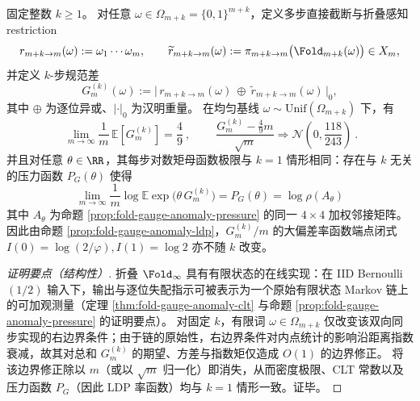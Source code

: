 










\begin{theorem}[多步降阶的规范差密度不变性]\label{thm:fold-gauge-anomaly-kstep-invariance}
固定整数 \(k\ge 1\)。
对任意 \(\omega\in\Omega_{m+k}=\{0,1\}^{m+k}\)，定义多步直接截断与折叠感知 restriction
\[
r_{m+k\to m}(\omega):=\omega_{1}\cdots\omega_{m},
\qquad
\widetilde r_{m+k\to m}(\omega):=\pi_{m+k\to m}\bigl(\Fold_{m+k}(\omega)\bigr)\in X_m,
\]
并定义 \(k\)-步规范差
\[
G_m^{(k)}(\omega):=\bigl|\,r_{m+k\to m}(\omega)\ \oplus\ \widetilde r_{m+k\to m}(\omega)\,\bigr|_0,
\]
其中 \(\oplus\) 为逐位异或、\(|\cdot|_0\) 为汉明重量。
在均匀基线 \(\omega\sim\mathrm{Unif}(\Omega_{m+k})\) 下，有
\[
\boxed{\ \lim_{m\to\infty}\frac{1}{m}\,\mathbb E\!\left[G_m^{(k)}\right]=\frac49\ },
\qquad
\boxed{\ \frac{G_m^{(k)}-\frac49 m}{\sqrt m}\Rightarrow \mathcal N\!\left(0,\frac{118}{243}\right)\ }.
\]
并且对任意 \(\theta\in\RR\)，其每步对数矩母函数极限与 \(k=1\) 情形相同：存在与 \(k\) 无关的压力函数 \(P_G(\theta)\) 使得
\[
\lim_{m\to\infty}\frac{1}{m}\log\mathbb E\exp\!\bigl(\theta\,G_m^{(k)}\bigr)=P_G(\theta)=\log\rho(A_\theta)
\]
其中 \(A_\theta\) 为命题 \ref{prop:fold-gauge-anomaly-pressure} 的同一 \(4\times 4\) 加权邻接矩阵。
因此由命题 \ref{prop:fold-gauge-anomaly-ldp}，\(G_m^{(k)}/m\) 的大偏差率函数端点闭式 \(I(0)=\log(2/\varphi), I(1)=\log 2\) 亦不随 \(k\) 改变。
\end{theorem}

\begin{proof}[证明要点（结构性）]
折叠 \(\Fold_\infty\) 具有有限状态的在线实现：在 IID Bernoulli\((1/2)\) 输入下，输出与逐位失配指示可被表示为一个原始有限状态 Markov 链上的可加观测量（定理 \ref{thm:fold-gauge-anomaly-clt} 与命题 \ref{prop:fold-gauge-anomaly-pressure} 的证明要点）。
对固定 \(k\)，有限词 \(\omega\in\Omega_{m+k}\) 仅改变该双向同步实现的右边界条件；由于链的原始性，右边界条件对内点统计的影响沿距离指数衰减，故其对总和 \(G_m^{(k)}\) 的期望、方差与指数矩仅造成 \(O(1)\) 的边界修正。
将该边界修正除以 \(m\)（或以 \(\sqrt m\) 归一化）即消失，从而密度极限、CLT 常数以及压力函数 \(P_G\)（因此 LDP 率函数）均与 \(k=1\) 情形一致。证毕。
\end{proof}

